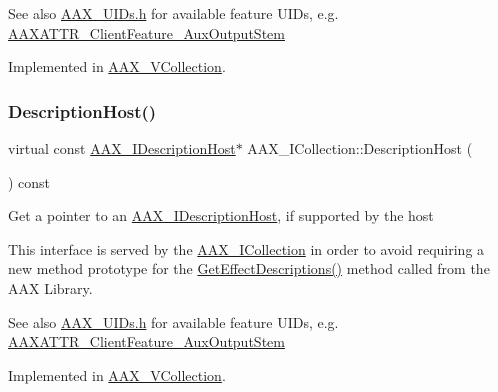 \begin{DoxySeeAlso}{See also}
\mbox{\hyperlink{a00683}{A\+A\+X\+\_\+\+U\+I\+Ds.\+h}} for available feature U\+I\+Ds, e.\+g. \mbox{\hyperlink{a00683_aa6369eb43ac68152d30ec665de5ea603}{A\+A\+X\+A\+T\+T\+R\+\_\+\+Client\+Feature\+\_\+\+Aux\+Output\+Stem}} 
\end{DoxySeeAlso}


Implemented in \mbox{\hyperlink{a01897_a6d76c238644027f8622618d3e5cc4e44}{A\+A\+X\+\_\+\+V\+Collection}}.

\mbox{\label{a01777_a47ed935bdc38c43efa64ec36cee03a7c}} 
\subsubsection{\texorpdfstring{DescriptionHost()}{DescriptionHost()}\hspace{0.1cm}{\footnotesize\ttfamily [2/2]}}
{\footnotesize\ttfamily virtual const \mbox{\hyperlink{a01793}{A\+A\+X\+\_\+\+I\+Description\+Host}}$\ast$ A\+A\+X\+\_\+\+I\+Collection\+::\+Description\+Host (\begin{DoxyParamCaption}{ }\end{DoxyParamCaption}) const\hspace{0.3cm}{\ttfamily [pure virtual]}}





Get a pointer to an \mbox{\hyperlink{a01793}{A\+A\+X\+\_\+\+I\+Description\+Host}}, if supported by the host

This interface is served by the \mbox{\hyperlink{a01777}{A\+A\+X\+\_\+\+I\+Collection}} in order to avoid requiring a new method prototype for the \mbox{\hyperlink{a00796_gae0d356eef326f77cbb972e48946d4892}{Get\+Effect\+Descriptions()}} method called from the A\+AX Library.

\begin{DoxySeeAlso}{See also}
\mbox{\hyperlink{a00683}{A\+A\+X\+\_\+\+U\+I\+Ds.\+h}} for available feature U\+I\+Ds, e.\+g. \mbox{\hyperlink{a00683_aa6369eb43ac68152d30ec665de5ea603}{A\+A\+X\+A\+T\+T\+R\+\_\+\+Client\+Feature\+\_\+\+Aux\+Output\+Stem}} 
\end{DoxySeeAlso}


Implemented in \mbox{\hyperlink{a01897_ac26e17d7bd1ec4be3bd178fdd0ff9be6}{A\+A\+X\+\_\+\+V\+Collection}}.

